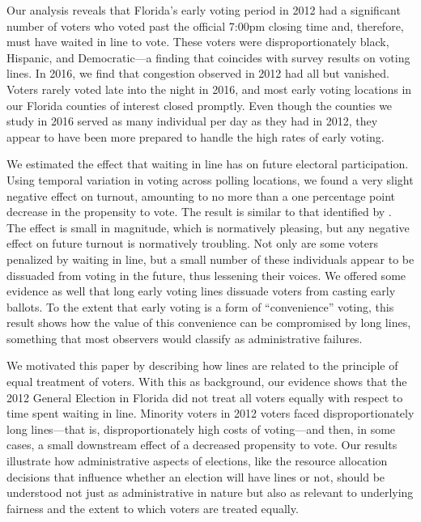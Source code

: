 \documentclass[12pt,titlepage]{article}
\begin{document}
Our analysis reveals that Florida's early voting period in 2012 had a
significant number of voters who voted past the official 7:00pm
closing time and, therefore, must have waited in line to vote.  These
voters were disproportionately black, Hispanic, and Democratic---a
finding that coincides with survey results on voting lines.  In 2016,
we find that congestion observed in 2012 had all but vanished.  Voters
rarely voted late into the night in 2016, and most early voting
locations in our Florida counties of interest closed promptly.  Even
though the counties we study in 2016 served as many individual per day
as they had in 2012, they appear to have been more prepared to handle
the high rates of early voting.
  
We estimated the effect that waiting in line has on future electoral
participation.  Using temporal variation in voting across polling
locations, we found a very slight negative effect on turnout,
amounting to no more than a one percentage point decrease in the
propensity to vote. The result is similar to that identified by
\citet{pettigrew:racegapwaittimes}.  The effect is small in magnitude,
which is normatively pleasing, but any negative effect on future
turnout is normatively troubling.  Not only are some voters penalized
by waiting in line, but a small number of these individuals appear to
be dissuaded from voting in the future, thus lessening their voices.
We offered some evidence as well that long early voting lines dissuade
voters from casting early ballots.  To the extent that early voting is
a form of ``convenience'' voting, this result shows how the value of
this convenience can be compromised by long lines, something that most
observers would classify as administrative failures.

We motivated this paper by describing how lines are related to the
principle of equal treatment of voters.  With this as background, our
evidence shows that the 2012 General Election in Florida did not treat
all voters equally with respect to time spent waiting in line.
Minority voters in 2012 voters faced disproportionately long
lines---that is, disproportionately high costs of voting---and then,
in some cases, a small downstream effect of a decreased propensity to
vote.  Our results illustrate how administrative aspects of elections,
like the resource allocation decisions that influence whether an
election will have lines or not, should be understood not just as
administrative in nature but also as relevant to underlying fairness
and the extent to which voters are treated equally.
\end{document}
